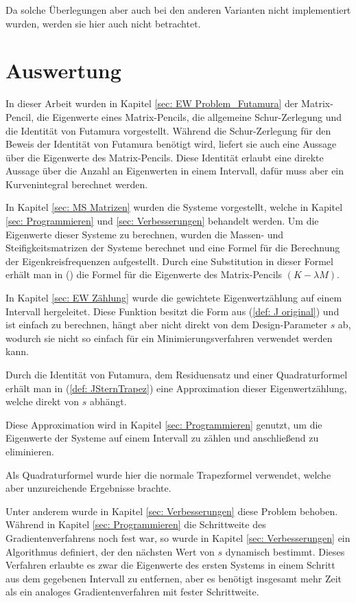 \documentclass[a4paper,12pt]{report}
\newcommand{\1}{\mathds{1}}
\theoremstyle{plain} %
\theoremstyle{definition} %
\theoremstyle{remark}
\begin{document}
            Da solche Überlegungen aber auch bei den anderen Varianten nicht implementiert wurden, werden sie hier auch nicht betrachtet.
\chapter{Auswertung}
\label{sec: Auswertung}

      In dieser Arbeit wurden in Kapitel \ref{sec: EW Problem_Futamura} der Matrix-Pencil, die Eigenwerte eines Matrix-Pencils,
      die allgemeine Schur-Zerlegung und die Identität von Futamura vorgestellt.
      Während die Schur-Zerlegung für den Beweis der Identität von Futamura benötigt wird, liefert sie auch eine Aussage über die Eigenwerte des Matrix-Pencils.
      Diese Identität erlaubt eine direkte Aussage über die Anzahl an Eigenwerten in einem Intervall, dafür muss aber ein Kurvenintegral berechnet werden.

      In Kapitel \ref{sec: MS Matrizen} wurden die Systeme vorgestellt, welche in Kapitel \ref{sec: Programmieren} und \ref{sec: Verbesserungen} behandelt werden.
      Um die Eigenwerte dieser Systeme zu berechnen, wurden die Massen- und Steifigkeitsmatrizen der Systeme berechnet und eine Formel für die Berechnung der Eigenkreisfrequenzen aufgestellt.
      Durch eine Substitution in dieser Formel erhält man in () die Formel für die Eigenwerte des Matrix-Pencils $(K-\lambda M)$.

      In Kapitel \ref{sec: EW Zählung} wurde die gewichtete Eigenwertzählung auf einem Intervall hergeleitet. Diese Funktion besitzt die Form aus (\ref{def: J original})
      und ist einfach zu berechnen, hängt aber nicht direkt von dem Design-Parameter $s$ ab,
      wodurch sie nicht so einfach für ein Minimierungsverfahren verwendet werden kann.

      Durch die Identität von Futamura, dem Residuensatz und einer Quadraturformel erhält man in (\ref{def: JSternTrapez}) eine Approximation dieser Eigenwertzählung,
      welche direkt von $s$ abhängt.

      Diese Approximation wird in Kapitel \ref{sec: Programmieren} genutzt, um die Eigenwerte der Systeme auf einem Intervall zu zählen und anschließend zu eliminieren.
      
      Als Quadraturformel wurde hier die normale Trapezformel verwendet, welche aber unzureichende Ergebnisse brachte.

      Unter anderem wurde in Kapitel \ref{sec: Verbesserungen} diese Problem behoben.
      Während in Kapitel \ref{sec: Programmieren} die Schrittweite des Gradientenverfahrens noch fest war, so wurde in Kapitel \ref{sec: Verbesserungen} ein Algorithmus definiert,
      der den nächsten Wert von $s$ dynamisch bestimmt.
      Dieses Verfahren erlaubte es zwar die Eigenwerte des ersten Systems in einem Schritt aus dem gegebenen Intervall zu entfernen,
      aber es benötigt insgesamt mehr Zeit als ein analoges Gradientenverfahren mit fester Schrittweite.
\end{document}
